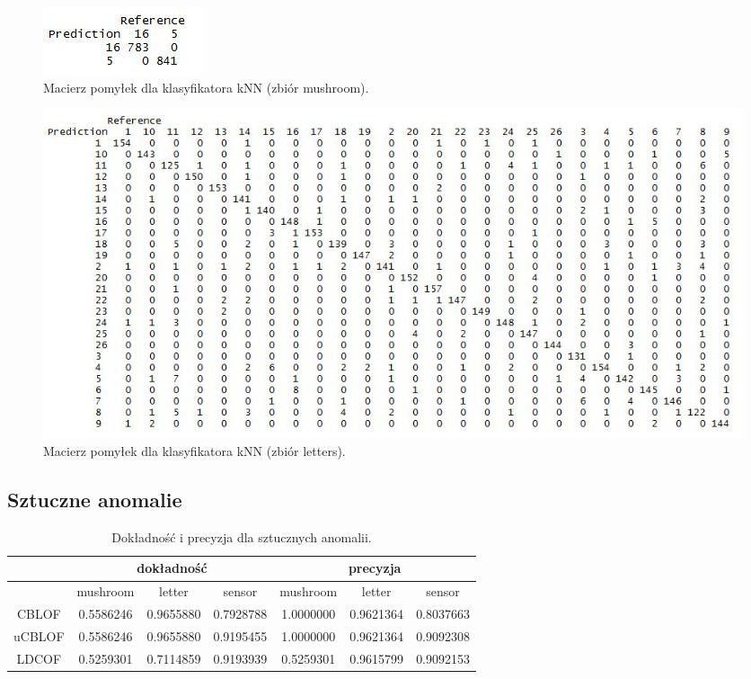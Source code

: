 \documentclass[11pt,a4paper,twoside]{article}
\begin{document}
\begin{figure}[H]
\centering
\includegraphics[scale=0.9]{confMatrixKnn_mushroom.JPG}
\caption{Macierz pomyłek dla klasyfikatora kNN (zbiór mushroom).}
\label{confMatrixJ48}
\end{figure}

\begin{figure}[H]
\centering
\includegraphics[scale=0.6]{confMatrixKnn_letters.JPG}
\caption{Macierz pomyłek dla klasyfikatora kNN (zbiór letters).}
\label{confMatrixJ48}
\end{figure}



\subsection {Sztuczne anomalie}




\begin{table}[ht]
\centering
\caption{Dokładność i precyzja dla sztucznych anomalii.}
\label{accPrec_v2}
\begin{tabular}{|*{7}{c|}}
\hline
 & \multicolumn{3}{c|}{dokładność} & \multicolumn{3}{c|}{precyzja} \\\hline
 & mushroom & letter & sensor & mushroom & letter & sensor \\\hline
 CBLOF &     0.5586246    &     0.9655880   &    0.7928788   &  1.0000000  &   0.9621364  &    0.8037663   \\\hline
 uCBLOF & 0.5586246   &      0.9655880    &   0.9195455   &   1.0000000  &   0.9621364   &  0.9092308   \\\hline
 LDCOF &    0.5259301    &      0.7114859    &   0.9193939   &  0.5259301  &   0.9615799   &   0.9092153   \\\hline
\end{tabular}
\end{table}
\end{document}
